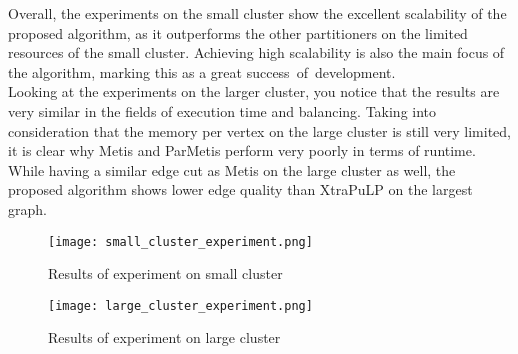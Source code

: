 \documentclass[acmsmall,nonacm,screen,review]{acmart}
\begin{document}
Overall, the experiments on the small cluster show the excellent scalability of the proposed algorithm, as it outperforms the other partitioners on the limited resources of the small cluster. Achieving high scalability is also the main focus of the algorithm, marking this as a great \hbox{success of development.} \\
Looking at the experiments on the larger cluster, you notice that the results are very similar in the fields of execution time and balancing. Taking into consideration that the memory per vertex on the large cluster is still very limited, it is clear why Metis and ParMetis perform very poorly in terms of runtime. While having a similar edge cut as Metis on the large cluster as well, the proposed algorithm shows lower edge quality than XtraPuLP on the largest graph.
\begin{figure}[t]
\centering
\caption{Results of experiment on small cluster}
\label{small_ex}
\texttt{[image: small\_cluster\_experiment.png]}
\end{figure}
\begin{figure}[t]
\centering
\caption{Results of experiment on large cluster}
\label{large_ex}
\texttt{[image: large\_cluster\_experiment.png]}
\end{figure}
\end{document}
